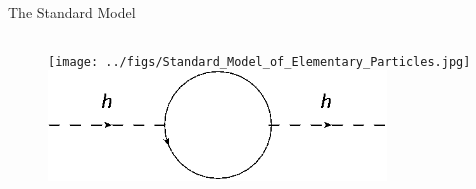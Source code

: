 \begin{frame}{The Standard Model}
\begin{columns}
\begin{column}{.50\textwidth}
\begin{figure}[!Hhtbp]
  \begin{center}
    \texttt{[image: ../figs/Standard\_Model\_of\_Elementary\_Particles.jpg]}\\
    \vspace{.6cm}
    \includegraphics[width=0.8\textwidth]{../figs/HierarchyLoop.png}
  \end{center}
\end{figure}
\end{column}
\end{columns}
\end{frame}


